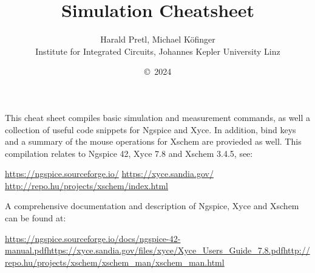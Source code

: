 \documentclass[10pt,a4paper]{article}
\author{Harald Pretl, Michael Köfinger\\Institute for Integrated Circuits, Johannes Kepler University Linz}
\title{Simulation Cheatsheet}
\date{\copyright~2024}
\begin{document}
	\maketitle
	
	This cheat sheet compiles basic simulation and measurement commands, as well a collection of useful code snippets for Ngspice and Xyce. In addition, bind keys and a summary of the mouse operations for Xschem are provieded as well. This compilation relates to Ngspice  42, Xyce 7.8 and Xschem 3.4.5, see:
	
	\url{https://ngspice.sourceforge.io/}\newline
	\url{https://xyce.sandia.gov/}\newline
	\url{http://repo.hu/projects/xschem/index.html}
	
	A comprehensive documentation and description of Ngspice, Xyce and Xschem can be found at:
	
	\url{https://ngspice.sourceforge.io/docs/ngspice-42-manual.pdf}\newline \url{https://xyce.sandia.gov/files/xyce/Xyce_Users_Guide_7.8.pdf}\newline \url{http://repo.hu/projects/xschem/xschem_man/xschem_man.html}
	
	\newpage
\end{document}
